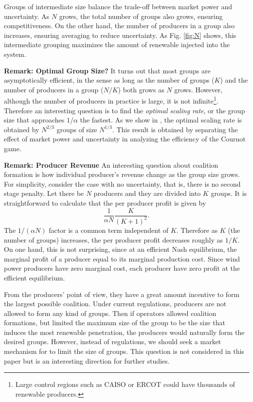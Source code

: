 \documentclass[journal]{IEEEtran}
\begin{document}
Groups of intermediate size balance the trade-off between market power and uncertainty.  As $N$ grows, the total number of groups also grows, ensuring competitiveness. On the other hand, the number of producers in a group also increases, ensuring averaging to reduce uncertainty. As Fig. \ref{fig:N} shows, this intermediate grouping maximizes the amount of renewable injected into the system. 

\textbf{Remark: Optimal Group Size?} It turns out that most groups are asymptotically efficient, in the sense as long as the number of groups ($K$) and the number of producers in a group ($N/K$) both grows as $N$ grows. However, although the number of producers in practice is large, it is not infinite\footnote{Large control regions such as CAISO or ERCOT could have thousands of renewable producers.}. Therefore an interesting question is to find the \emph{optimal scaling rate}, or the group size that approaches $1/\alpha$ the fastest. As we show in  \cite{Zhang14}, the optimal scaling rate is obtained by $N^{2/3}$ groups of size $N^{1/3}$.  This result is obtained by separating the effect of market power and uncertainty in analyzing the efficiency of the Cournot game. 

\textbf{Remark: Producer Revenue} An interesting question about coalition formation is how individual producer's revenue change as the group size grows. For simplicity, consider the case with no uncertainty, that is, there is no second stage penalty. Let there be $N$ producers and they are divided into $K$ groups. It is straightforward to calculate that the per producer profit is given by 
\begin{equation*}
\frac{1}{\alpha N} \frac{K}{(K+1)^2}.
\end{equation*}
The $1/(\alpha N)$ factor is a common term independent of $K$. Therefore as $K$ (the number of groups) increases, the per producer profit decreases roughly as $1/K$. On one hand, this is not surprising, since at an efficient Nash equilibrium, the marginal profit of a producer equal to its marginal production cost. Since wind power producers have zero marginal cost, each producer have zero profit at the efficient equilibrium. 

From the producers' point of view,  they have a great amount incentive to form the largest possible coalition. Under current regulations, producers are not allowed to form any kind of groups. Then if operators allowed coalition formations, but limited the maximum size of the group to be the size that induces the most renewable penetration, the producers would naturally form the desired groups. However, 
instead of regulations, we should seek a market mechanism for to limit the size of groups. This question is not considered in this paper but is an interesting direction for further studies. 
\end{document}
